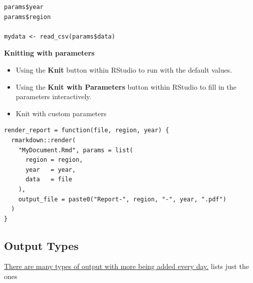 \documentclass[]{book}
\providecommand{\tightlist}{%
  \setlength{\itemsep}{0pt}\setlength{\parskip}{0pt}}
\theoremstyle{definition}
\theoremstyle{definition}
\theoremstyle{definition}
\theoremstyle{remark}
\begin{document}
\begin{verbatim}
params$year
params$region

mydata <- read_csv(params$data)
\end{verbatim}

\textbf{Knitting with parameters}

\begin{itemize}
\tightlist
\item
  Using the \textbf{Knit} button within RStudio to run with the default
  values.
\item
  Using the \textbf{Knit with Parameters} button within RStudio to fill
  in the parameters interactively.
\item
  Knit with custom parameters
\end{itemize}

\begin{verbatim}
render_report = function(file, region, year) {
  rmarkdown::render(
    "MyDocument.Rmd", params = list(
      region = region,
      year   = year,
      data   = file
    ),
    output_file = paste0("Report-", region, "-", year, ".pdf")
  )
}
\end{verbatim}

\hypertarget{output-types}{%
\subsection{Output Types}\label{output-types}}

\href{https://rmarkdown.rstudio.com/formats.html}{There are many types
of output with more being added every day.} lists just the ones
\end{document}

